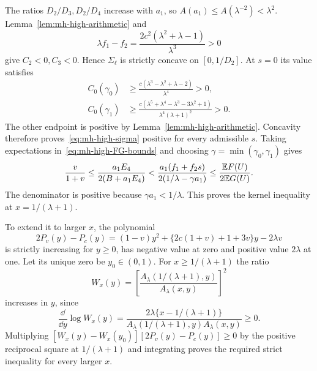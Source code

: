 The ratios $D_2/D_3,D_2/D_4$ increase with $a_1$, so $A(a_1)\le A(\lambda^{-2})<\lambda^2$. Lemma~\ref{lem:mh-high-arithmetic} and
\[
 \lambda f_1-f_2=\frac{2c^2(\lambda^2+\lambda-1)}{\lambda^3}>0
\]
give $C_2<0,C_3<0$. Hence $\Sigma_\ell$ is strictly concave on $[0,1/D_2]$. At $s=0$ its value satisfies
\begin{align*}
 C_0(\gamma_0)&\ge\frac{c(\lambda^3-\lambda^2+\lambda-2)}{\lambda^4}>0,\\
 C_0(\gamma_1)&\ge\frac{c(\lambda^5+\lambda^4-\lambda^3-3\lambda^2+1)}{\lambda^4(\lambda+1)^2}>0.
\end{align*}
The other endpoint is positive by Lemma~\ref{lem:mh-high-arithmetic}. Concavity therefore proves~\eqref{eq:mh-high-sigma} positive for every admissible $s$.
Taking expectations in~\eqref{eq:mh-high-FG-bounds} and choosing $\gamma=\min(\gamma_0,\gamma_1)$ gives
\[
 \frac{v}{1+v}\le\frac{a_1E_4}{2(B+a_1E_4)}
 <\frac{a_1(f_1+f_2s)}{2(1/\lambda-\gamma a_1)}
 \le\frac{\mathbb E F(U)}{2\mathbb E G(U)}.
\]
The denominator is positive because $\gamma a_1<1/\lambda$. This proves the kernel inequality at $x=1/(\lambda+1)$.

To extend it to larger $x$, the polynomial
\[
 2P_v(y)-P_c(y)
 =(1-v)y^2+\{2c(1+v)+1+3v\}y-2\lambda v
\]
is strictly increasing for $y\ge0$, has negative value at zero and positive value $2\lambda$ at one. Let its unique zero be $y_0\in(0,1)$. For $x\ge1/(\lambda+1)$ the ratio
\[
 W_x(y)=\left[\frac{A_\lambda(1/(\lambda+1),y)}{A_\lambda(x,y)}\right]^2
\]
increases in $y$, since
\[
 \frac{\dd}{\dd y}\log W_x(y)
 =\frac{2\lambda\{x-1/(\lambda+1)\}}
 {A_\lambda(1/(\lambda+1),y)A_\lambda(x,y)}\ge0.
\]
Multiplying $[W_x(y)-W_x(y_0)][2P_v(y)-P_c(y)]\ge0$ by the positive reciprocal square at $1/(\lambda+1)$ and integrating proves the required strict inequality for every larger $x$.

